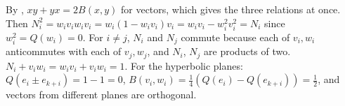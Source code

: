 By , $xy + yx = 2B(x, y)$ for vectors, which gives the three relations at once. Then $N_i^{2} = w_i v_i w_i v_i = w_i (1 - w_i v_i) v_i = w_i v_i - w_i^{2} v_i^{2} = N_i$ since $w_i^{2} = Q(w_i) = 0$. For $i \ne j$, $N_i$ and $N_j$ commute because each of $v_i, w_i$ anticommutes with each of $v_j, w_j$, and $N_i$, $N_j$ are products of two. $N_i + v_i w_i = w_i v_i + v_i w_i = 1$. For the hyperbolic planes: $Q(e_i \pm e_{k+i}) = 1 - 1 = 0$, $B(v_i, w_i) = \tfrac14(Q(e_i) - Q(e_{k+i})) = \tfrac12$, and vectors from different planes are orthogonal.
